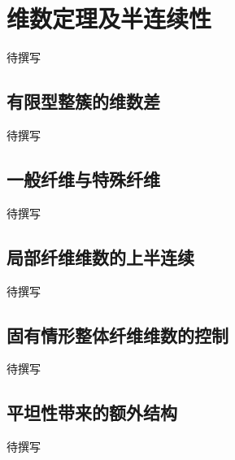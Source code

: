 
% 
% 
% 

\section{维数定理及半连续性}
\label{g5:sec:1104}

待撰写

\subsection{有限型整簇的维数差}
\label{g5:subsec:1104:01}
待撰写

\subsection{一般纤维与特殊纤维}
\label{g5:subsec:1104:02}
待撰写

\subsection{局部纤维维数的上半连续}
\label{g5:subsec:1104:03}
待撰写

\subsection{固有情形整体纤维维数的控制}
\label{g5:subsec:1104:04}
待撰写

\subsection{平坦性带来的额外结构}
\label{g5:subsec:1104:05}
待撰写

